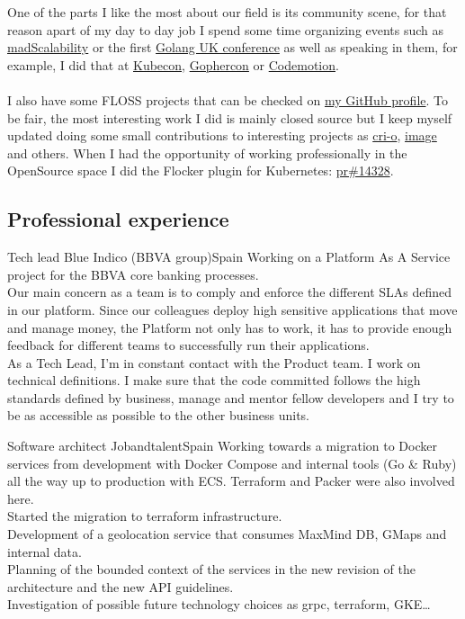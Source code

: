 \documentclass[11pt, a4paper, sans]{moderncv}
\begin{document}
\makecvtitle


%
%

One of the parts I like the most about our field is its community scene, for that reason apart of my day to day job
I spend some time organizing events such as \href{https://www.meetup.com/mad-scalability/}{madScalability} or
the first \href{https://golanguk.com/}{Golang UK conference} as well as speaking in them,
for example, I did that at \href{https://www.kubecon.io}{Kubecon}, \href{https://www.gophercon.co.uk/}{Gophercon} or \href{https://codemotionworld.com/}{Codemotion}.\\
\\
I also have some FLOSS projects that can be checked on \href{https://github.com/agonzalezro}{my GitHub profile}.
To be fair, the most interesting work I did is mainly closed source but I keep myself updated doing some small contributions to interesting projects as \href{https://github.com/agonzalezro/cri-o}{cri-o}, \href{https://github.com/containers/image}{image} and others.
When I had the opportunity of working professionally in the OpenSource space I did the Flocker plugin for Kubernetes: \href{https://github.com/kubernetes/kubernetes/pull/14328}{pr\#14328}.\\

\subsection{Professional experience}
{Tech lead}
{Blue Indico (BBVA group)}{Spain}{}
{Working on a Platform As A Service project for the BBVA core banking processes.\\
Our main concern as a team is to comply and enforce the different SLAs defined in our platform. Since our colleagues deploy high sensitive applications that move and manage money, the Platform not only has to work, it has to provide enough feedback for different teams to successfully run their applications.\\
As a Tech Lead, I’m in constant contact with the Product team. I work on technical definitions. I make sure that the code committed follows the high standards defined by business, manage and mentor fellow developers and I try to be as accessible as possible to the other business units.\\}

{Software architect}
{Jobandtalent}{Spain}{}
{Working towards a migration to Docker services from development with
  Docker Compose and internal tools (Go \& Ruby) all the way up to
  production with ECS. Terraform and Packer were also involved here.\\
  Started the migration to terraform infrastructure.\\
Development of a geolocation service that consumes MaxMind DB, GMaps and
internal data.\\
Planning of the bounded context of the services in the new revision of the
architecture and the new API guidelines.\\
Investigation of possible future technology choices as grpc, terraform, GKE\ldots\\}
\end{document}
